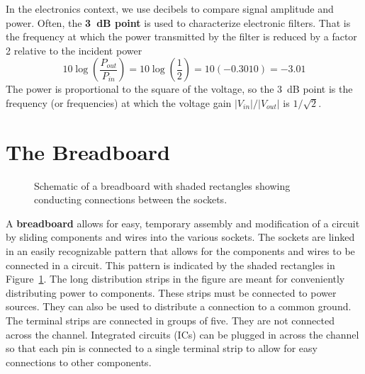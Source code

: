 \documentclass[11pt]{article}
\begin{document}
In the electronics context, we use decibels to compare signal
amplitude and power. Often, the \textbf{3~dB point} is used to characterize 
electronic filters. That is the frequency at which the power
transmitted by the filter is reduced by a factor 2 relative to the
incident power 
\[
10 \log \left( \frac{P_{out}}{P_{in}} \right)
= 10 \log \left( \frac{1}{2} \right) = 10 (-0.3010) = -3.01
\]
The power is proportional to the square of the voltage, so the 3~dB
point is the frequency (or frequencies) at which the voltage gain
$|V_{in}|/|V_{out}|$ is $1/\sqrt{2}$. 

\section{The Breadboard}
\label{sec:breadboard}

\begin{figure}[ht]
  \begin{center}
    \caption{Schematic of a breadboard with shaded rectangles showing
      conducting connections between the sockets.}
    \label{fig:breadboard}
  \end{center}
\end{figure}

A \textbf{breadboard} allows for easy, temporary assembly and
modification of a circuit by sliding components and wires into the
various sockets. The sockets are linked in an easily recognizable
pattern that allows for the components and wires to be connected in a
circuit. This pattern is indicated by the shaded rectangles in
Figure~\ref{fig:breadboard}.  The long distribution strips in the
figure are meant for conveniently distributing power to
components. These strips must be connected to power sources. They can
also be used to distribute a connection to a common ground.  The
terminal strips are connected in groups of five. They are not
connected across the channel. Integrated circuits (ICs) can be plugged
in across the channel so that each pin is connected to a single
terminal strip to allow for easy connections to other components.
\end{document}

